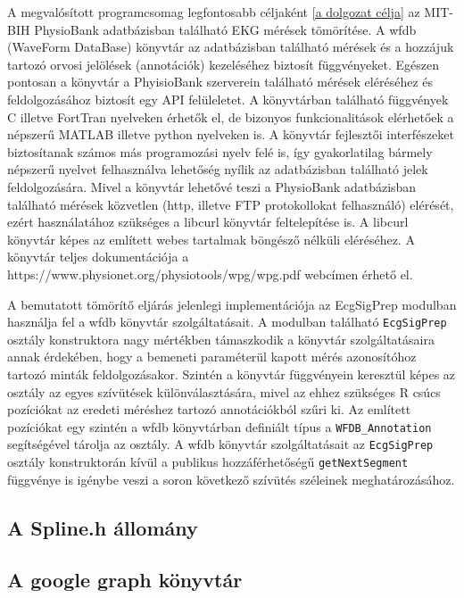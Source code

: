 \documentclass[oneside,titlepage,12pt,a4paper]{report}
\begin{document}
A megvalósított programcsomag legfontosabb céljaként \ref{a dolgozat célja} az MIT-BIH PhysioBank adatbázisban található EKG mérések tömörítése. A wfdb (WaveForm DataBase) könyvtár az adatbázisban található mérések és a hozzájuk tartozó orvosi jelölések (annotációk) kezeléséhez biztosít függvényeket. Egészen pontosan a könyvtár a PhyisioBank szerverein található mérések eléréséhez és feldolgozásához biztosít egy API felüleletet. A könyvtárban található függvények C illetve FortTran nyelveken érhetők el, de bizonyos funkcionalitások elérhetőek a népszerű MATLAB illetve python nyelveken is. A könyvtár fejlesztői interfészeket biztosítanak számos más programozási nyelv felé is, így gyakorlatilag bármely népszerű nyelvet felhasználva lehetőség nyílik az adatbázisban található jelek feldolgozására. Mivel a könyvtár lehetővé teszi a PhysioBank adatbázisban található mérések közvetlen (http, illetve FTP protokollokat felhasználó) elérését, ezért használatához szükséges a libcurl könyvtár feltelepítése is. A libcurl könyvtár képes az említett webes tartalmak böngésző nélküli eléréséhez. A könyvtár teljes dokumentációja a https://www.physionet.org/physiotools/wpg/wpg.pdf webcímen érhető el. 
\par A bemutatott tömörítő eljárás jelenlegi implementációja az EcgSigPrep modulban használja fel a wfdb könyvtár szolgáltatásait. A modulban található \texttt{EcgSigPrep} osztály konstruktora nagy mértékben támaszkodik a könyvtár szolgáltatásaira annak érdekében, hogy a bemeneti paraméterül kapott mérés azonosítóhoz tartozó minták feldolgozásakor. Szintén a könyvtár függvényein keresztül képes az osztály az egyes szívütések különválasztására, mivel az ehhez szükséges R csúcs pozíciókat az eredeti méréshez tartozó annotációkból szűri ki. Az említett pozíciókat egy szintén a wfdb könyvtárban definiált típus a \texttt{WFDB\_Annotation} segítségével tárolja az osztály. A wfdb könyvtár szolgáltatásait az \texttt{EcgSigPrep} osztály konstruktorán kívül a publikus hozzáférhetőségű \texttt{getNextSegment} függvénye is igénybe veszi a soron következő szívütés széleinek meghatározásához. 

\subsection*{A Spline.h állomány}



\subsection*{A google graph könyvtár}
\end{document}
